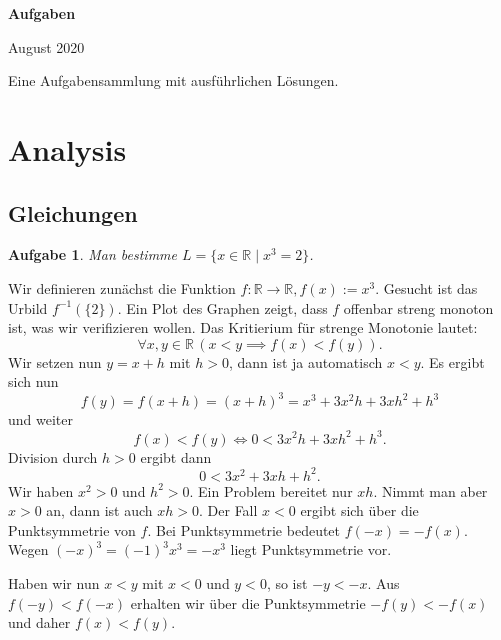 \documentclass[a4paper,10pt,fleqn,twoside]{scrartcl}
\numberwithin{equation}{section}
\newcommand{\R}{\mathbb R}
\newcommand{\strong}[1]{{\normalfont\sffamily\bfseries #1}}
\theoremstyle{Aufgabe}
\newtheorem{Aufgabe}{\sffamily Aufgabe}[section]
\begin{document}
\setlength{\baselineskip}{14pt} 
\thispagestyle{empty}


\noindent
{\huge\normalfont\sffamily\bfseries Aufgaben\par}

\vspace{2mm}
\noindent August 2020

\vspace{2mm}
\noindent
Eine Aufgabensammlung mit ausführlichen Lösungen.

\tableofcontents

\newpage
\section{Analysis}
\subsection{Gleichungen}
\begin{Aufgabe}
Man bestimme $L=\{x\in\R\mid x^3=2\}$.
\end{Aufgabe}

\noindent\strong{Lösung.}
Wir definieren zunächst die Funktion $f\colon\R\to\R, f(x):=x^3$.
Gesucht ist das Urbild $f^{-1}(\{2\})$.
Ein Plot des Graphen zeigt, dass $f$ offenbar streng monoton ist, was
wir verifizieren wollen. Das Kritierium für strenge Monotonie lautet:
\begin{equation}
\forall x,y\in\R\,(x<y\implies f(x)<f(y)).
\end{equation}
Wir setzen nun $y=x+h$ mit $h>0$, dann ist ja automatisch $x<y$.
Es ergibt sich nun
\begin{equation}
f(y) = f(x+h) = (x+h)^3 = x^3+3x^2h+3xh^2+h^3
\end{equation}
und weiter
\begin{equation}
f(x)<f(y) \iff 0 < 3x^2 h+3xh^2+h^3.
\end{equation}
Division durch $h>0$ ergibt dann
\begin{equation}
0 < 3x^2+3xh+h^2.
\end{equation}
Wir haben $x^2>0$ und $h^2>0$. Ein Problem bereitet nur $xh$. Nimmt man
aber $x>0$ an, dann ist auch $xh>0$. Der Fall $x<0$ ergibt sich
über die Punktsymmetrie von $f$. Bei Punktsymmetrie bedeutet $f(-x)=-f(x)$.
Wegen $(-x)^3=(-1)^3x^3=-x^3$ liegt Punktsymmetrie vor.

Haben wir nun $x<y$ mit $x<0$ und $y<0$, so ist $-y<-x$. Aus
$f(-y)<f(-x)$ erhalten wir über die Punktsymmetrie $-f(y)<-f(x)$
und daher $f(x)<f(y)$.
\end{document}
